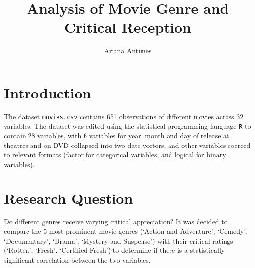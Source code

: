\documentclass[12pt,a4paper]{article}
\author{Ariana Antunes}
\title{Analysis of Movie Genre and Critical Reception}
\begin{document}
	\maketitle
	
	\section*{Introduction}
	The dataset {\tt movies.csv} contains 651 observations of different movies across 32 variables. The dataset was edited using the statistical programming language {\tt R} to contain 28 variables, with 6 variables for year, month and day of release at theatres and on DVD collapsed into two date vectors, and other variables coerced to relevant formats (factor for categorical variables, and logical for binary variables). 
	
	\section*{Research Question}
	Do different genres receive varying critical appreciation? It was decided to compare the 5 most prominent movie genres (`Action and Adventure', `Comedy', `Documentary', `Drama', `Mystery and Suspense') with their critical ratings (`Rotten', `Fresh', `Certified Fresh') to determine if there is a statistically significant correlation between the two variables.
	
\end{document}
